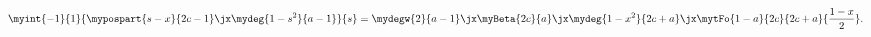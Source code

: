 \begin{equation*}
    \myint{-1}{1}{\mypospart{s-x}{2c-1}\jx\mydeg{1-s^2}{a-1}}{s}
    =
    \mydegw{2}{a-1}\jx
    \myBeta{2c}{a}\jx
    \mydeg{1-x^2}{2c+a}\jx
    \mytFo{1-a}{2c}{2c+a}{\frac{1-x}{2}}
        .
\end{equation*}
